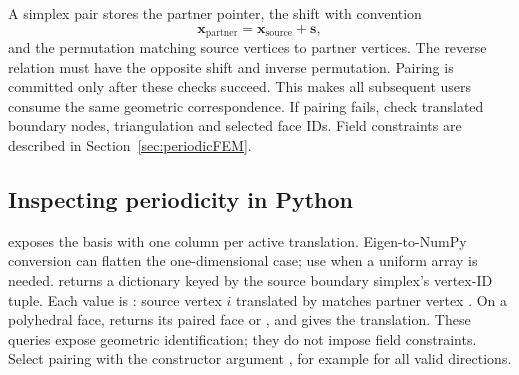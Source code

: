 A simplex pair stores the partner pointer, the shift with convention
\begin{equation}
\bm x_{\mathrm{partner}}=\bm x_{\mathrm{source}}+\bm s,
\end{equation}
and the permutation matching source vertices to partner vertices. The reverse relation must have the opposite shift and inverse permutation. Pairing is committed only after these checks succeed. This makes all subsequent users consume the same geometric correspondence.
If pairing fails, check translated boundary nodes, triangulation and selected face IDs. Field constraints are described in Section~\ref{sec:periodicFEM}.


\subsection{Inspecting periodicity in Python}
 exposes the basis with one column per active translation. Eigen-to-NumPy conversion can flatten the one-dimensional case; use  when a uniform  array is needed.  returns a dictionary keyed by the source boundary simplex's vertex-ID tuple. Each value is : source vertex $i$ translated by  matches partner vertex . On a polyhedral face,  returns its paired face or , and  gives the translation. These queries expose geometric identification; they do not impose field constraints. Select pairing with the constructor argument , for example  for all valid directions.
